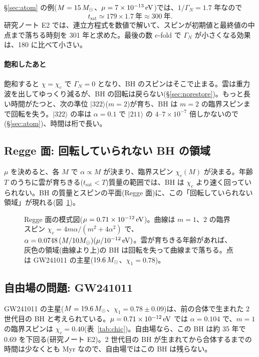 \begin{numcheck}
\S\ref{sec:atom} の例($M=15\,M_\odot$、$\mu=7\times10^{-13}\,\mathrm{eV}$)では、$1/\Gamma_N=1.7$ 年なので
\[
t_\mathrm{sat}\simeq179\times1.7\ \text{年}\approx300\ \text{年}.
\]
研究ノート E2 では、連立方程式を数値で解いて、スピンが初期値と最終値の中点まで落ちる時刻を 301 年と求めた。最後の数 $e$-fold で $\Gamma_N$ が小さくなる効果は、180 に比べて小さい。
\end{numcheck}

\paragraph{飽和したあと}
飽和すると $\chi=\chi_c$ で $\Gamma_N=0$ となり、BH のスピンはそこで止まる。雲は重力波を出してゆっくり減るが、BH の回転は戻らない(\S\ref{sec:norestore})。もっと長い時間がたつと、次の準位 $|322\rangle$($m=2$)が育ち、BH は $m=2$ の臨界スピンまで回転を失う。$|322\rangle$ の率は $\alpha=0.1$ で $|211\rangle$ の $4$--$7\times10^{-7}$ 倍しかないので(\S\ref{sec:atom})、時間は桁で長い。

\subsection{Regge 面: 回転していられない BH の領域}

$\mu$ を決めると、各 $M$ で $\alpha\propto M$ が決まり、臨界スピン $\chi_c(M)$ が決まる。年齢 $T$ のうちに雲が育ちきる($t_\mathrm{sat}<T$)質量の範囲では、BH は $\chi_c$ より速く回っていられない。BH の質量とスピンの平面(Regge 面)に、この「回転していられない領域」が現れる(図~\ref{fig:regge})。

\begin{figure}[H]
\centering

\caption{Regge 面の模式図($\mu=0.71\times10^{-12}\,\mathrm{eV}$)。曲線は $m=1$、$2$ の臨界スピン $\chi_c=4m\alpha/(m^2+4\alpha^2)$ で、$\alpha=0.0748\,(M/10M_\odot)(\mu/10^{-12}\,\mathrm{eV})$。雲が育ちきる年齢があれば、灰色の領域(曲線より上)の BH は回転を失って曲線まで落ちる。点は GW241011 の主星($19.6\,M_\odot$、$\chi_1=0.78$)。}
\label{fig:regge}
\end{figure}

\subsection{自由場の問題: GW241011}

GW241011 の主星($M=19.6\,M_\odot$、$\chi_1=0.78\pm0.09$)は、前の合体で生まれた 2 世代目の BH と考えられている。$\mu=0.71\times10^{-12}\,\mathrm{eV}$ では $\alpha=0.104$ で、$m=1$ の臨界スピンは $\chi_c=0.40$(表~\ref{tab:chic})。自由場なら、この BH は約 35 年で $0.69$ を下回る(研究ノート E2)。2 世代目の BH が生まれてから合体するまでの時間は少なくとも Myr なので、自由場ではこの BH は残らない。


